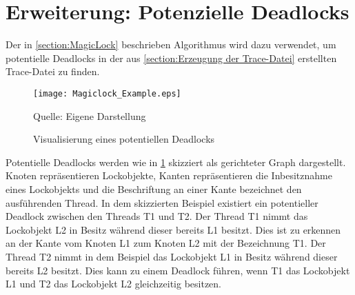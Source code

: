 \section{Erweiterung: Potenzielle Deadlocks}
\label{section:Erweiterung: Potenzielle Deadlocks}
Der in \cref{section:MagicLock} beschrieben Algorithmus wird dazu verwendet, um
potentielle Deadlocks in der aus \cref{section:Erzeugung der Trace-Datei}
erstellten Trace-Datei zu finden. 
\begin{figure}[ht]
  \begin{center}
    \texttt{[image: Magiclock\_Example.eps]}
  \end{center}
  \footnotesize\sffamily Quelle: Eigene Darstellung
  \caption{Visualisierung eines potentiellen Deadlocks}
  \label{fig:Magiclock_Example}
\end{figure}

Potentielle Deadlocks werden wie in \cref{fig:Magiclock_Example} skizziert als
gerichteter Graph dargestellt. Knoten repräsentieren Lockobjekte, Kanten
repräsentieren die Inbesitznahme eines Lockobjekts und die Beschriftung an einer
Kante bezeichnet den ausführenden Thread. In dem skizzierten Beispiel existiert
ein potentieller Deadlock zwischen den Threads \textrm{T1} und \textrm{T2}. Der
Thread \textrm{T1} nimmt das Lockobjekt \textrm{L2} in Besitz während dieser
bereits \textrm{L1} besitzt. Dies ist zu erkennen an der Kante vom Knoten
\textrm{L1} zum Knoten \textrm{L2} mit der Bezeichnung \textrm{T1}. Der Thread
\textrm{T2} nimmt in dem Beispiel das Lockobjekt \textrm{L1} in Besitz während
dieser bereits \textrm{L2} besitzt. Dies kann zu einem Deadlock führen, wenn
\textrm{T1} das Lockobjekt \textrm{L1} und \textrm{T2} das Lockobjekt
\textrm{L2} gleichzeitig besitzen.